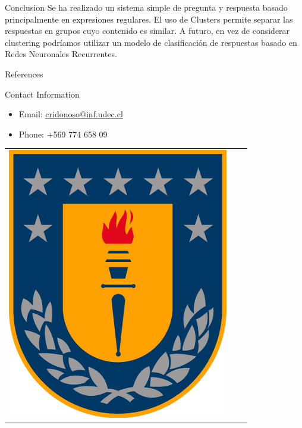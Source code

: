 \documentclass[final]{beamer}
\newlength{\onecolwid}
\begin{document}
\begin{frame}[t]
\begin{columns}[t]
\begin{column}{\onecolwid}
\begin{block}{Conclusion}
Se ha realizado un sistema simple de pregunta y respuesta basado principalmente en expresiones regulares. El uso de Clusters permite separar las respuestas en grupos cuyo contenido es similar. A futuro, en vez de considerar clustering podríamos utilizar un modelo de clasificación de respuestas basado en Redes Neuronales Recurrentes.
\end{block}



\begin{block}{References}

\nocite{*} %
\small{
\vspace{0.75in}}

\end{block}



\begin{alertblock}{Contact Information}

\begin{itemize}
\item Email: \href{mailto:cridonoso@inf.udec.cl}{cridonoso@inf.udec.cl}
\item Phone: +569 774 658 09
\end{itemize}

\end{alertblock}

\begin{center}
\begin{tabular}{ccc}
\includegraphics[width=0.4\linewidth]{./img/logo.png}  
\end{tabular}
\end{center}


\end{column}
\end{columns}
\end{frame}
\end{document}
